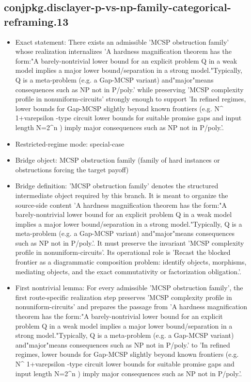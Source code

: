 \documentclass[11pt]{article}
\begin{document}
\subsection*{conjpkg.disclayer-p-vs-np-family-categorical-reframing.13}
\begin{itemize}
\item Exact statement: There exists an admissible 'MCSP obstruction family' whose realization internalizes 'A hardness magnification theorem has the form:"A barely-nontrivial lower bound for an explicit problem Q in a weak model implies a major lower bound/separation in a strong model."Typically, Q is a meta-problem (e.g. a Gap-MCSP variant) and"major"means consequences such as NP not in P/poly.' while preserving 'MCSP complexity profile in nonuniform-circuits' strongly enough to support 'In refined regimes, lower bounds for Gap-MCSP slightly beyond known frontiers (e.g. N\textasciicircum{} 1+varepsilon -type circuit lower bounds for suitable promise gaps and input length N=2\textasciicircum{}n ) imply major consequences such as NP not in P/poly.'.
\item Restricted-regime mode: special-case
\item Bridge object: MCSP obstruction family (family of hard instances or obstructions forcing the target payoff)
\item Bridge definition: 'MCSP obstruction family' denotes the structured intermediate object required by this branch. It is meant to organize the source-side content 'A hardness magnification theorem has the form:"A barely-nontrivial lower bound for an explicit problem Q in a weak model implies a major lower bound/separation in a strong model."Typically, Q is a meta-problem (e.g. a Gap-MCSP variant) and"major"means consequences such as NP not in P/poly.'. It must preserve the invariant 'MCSP complexity profile in nonuniform-circuits'. Its operational role is 'Recast the blocked frontier as a diagrammatic composition problem: identify objects, morphisms, mediating objects, and the exact commutativity or factorization obligation.'.
\item First nontrivial lemma: For every admissible 'MCSP obstruction family', the first route-specific realization step preserves 'MCSP complexity profile in nonuniform-circuits' and prepares the passage from 'A hardness magnification theorem has the form:"A barely-nontrivial lower bound for an explicit problem Q in a weak model implies a major lower bound/separation in a strong model."Typically, Q is a meta-problem (e.g. a Gap-MCSP variant) and"major"means consequences such as NP not in P/poly.' to 'In refined regimes, lower bounds for Gap-MCSP slightly beyond known frontiers (e.g. N\textasciicircum{} 1+varepsilon -type circuit lower bounds for suitable promise gaps and input length N=2\textasciicircum{}n ) imply major consequences such as NP not in P/poly.'.

\end{itemize}
\end{document}
